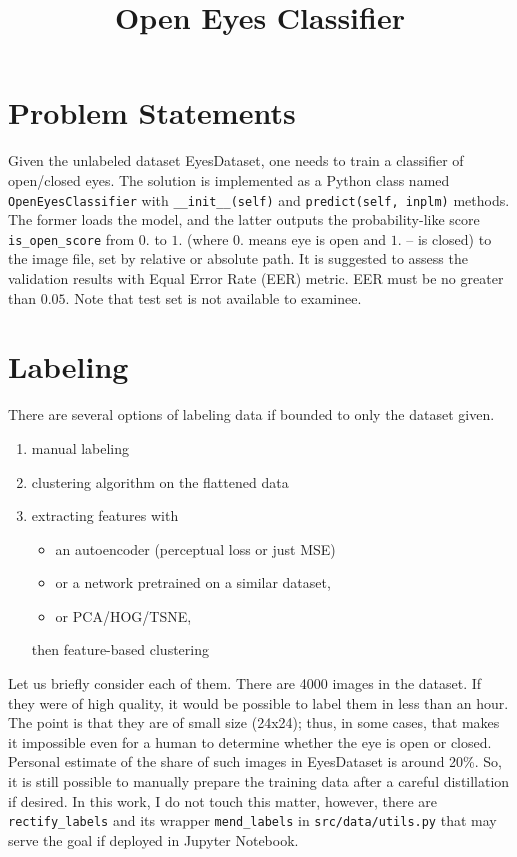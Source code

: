\documentclass{article}
\title{Open Eyes Classifier}
\date{}
\begin{document}
\maketitle

\vspace{-3cm}
\section{Problem Statements}

Given the unlabeled dataset EyesDataset, one needs to train a classifier of
open/closed eyes. The solution is implemented as a Python class named
\verb|OpenEyesClassifier| with \verb|__init__(self)| and \verb|predict(self, inplm)|
methods. The former loads the model, and the latter outputs the probability-like
score \verb|is_open_score| from $0.$ to $1.$ (where $0.$ means eye is open and
$1.$ -- is closed) to the image file, set by relative or absolute path. It is
suggested to assess the validation results with Equal Error Rate (EER) metric.
EER must be no greater than $0.05$. Note that test set is not available to
examinee.
 

\section{Labeling}

There are several options of labeling data if bounded to only the dataset given.

\begin{enumerate}
\item manual labeling

\item clustering algorithm on the flattened data

\item extracting features with
  \begin{itemize} 
      \item an autoencoder (perceptual loss or just MSE)
      \item or a network pretrained on a similar dataset,
      \item or PCA/HOG/TSNE,
  \end{itemize}
  then feature-based clustering 
\end{enumerate}

Let us briefly consider each of them. There are 4000 images in the dataset. If
they were of high quality, it would be possible to label them in less than an
hour. The point is that they are of small size (24x24); thus, in some cases,
that makes it impossible even for a human to determine whether the eye is open
or closed. Personal estimate of the share of such images in EyesDataset is
around 20\%. So, it is still possible to manually prepare the training data
after a careful distillation if desired. In this work, I do not touch this
matter, however, there are \verb|rectify_labels| and its wrapper
\verb|mend_labels| in \verb|src/data/utils.py| that may serve the goal if
deployed in Jupyter Notebook.
\end{document}
